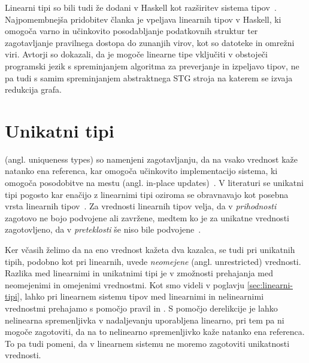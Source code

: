 Linearni tipi so bili tudi že dodani v Haskell kot razširitev sistema tipov~\cite{bernardy2018linear}. Najpomembnejša pridobitev članka je vpeljava linearnih tipov v Haskell, ki omogoča varno in učinkovito posodabljanje podatkovnih struktur ter zagotavljanje pravilnega dostopa do zunanjih virov, kot so datoteke in omrežni viri. Avtorji so dokazali, da je mogoče linearne tipe vključiti v obstoječi programski jezik s spreminjanjem algoritma za preverjanje in izpeljavo tipov, ne pa tudi s samim spreminjanjem abstraktnega STG stroja na katerem se izvaja redukcija grafa.

\section{Unikatni tipi}
\label{sec:unikatni-tipi}


 (angl. uniqueness types) so namenjeni zagotavljanju, da na vsako vrednost kaže natanko ena referenca, kar omogoča učinkovito implementacijo sistema, ki omogoča posodobitve na mestu (angl. in-place updates)~\cite{marshall2022linearity}. V literaturi se unikatni tipi pogosto kar enačijo z linearnimi tipi oziroma se obravnavajo kot posebna vrsta linearnih tipov~\cite{pierce2004advanced, bernardy2018linear}. Za vrednosti linearnih tipov velja, da v \textit{prihodnosti} zagotovo ne bojo podvojene ali zavržene, medtem ko je za unikatne vrednosti zagotovljeno, da v \textit{preteklosti} še niso bile podvojene~\cite{marshall2022linearity, marshall2024functional}.

Ker včasih želimo da na eno vrednost kažeta dva kazalca, se tudi pri unikatnih tipih, podobno kot pri linearnih, uvede \emph{neomejene} (angl. unrestricted) vrednosti. Razlika med linearnimi in unikatnimi tipi je v zmožnosti prehajanja med neomejenimi in omejenimi vrednostmi. Kot smo videli v poglavju \ref{sec:linearni-tipi}, lahko pri linearnem sistemu tipov med linearnimi in nelinearnimi vrednostmi prehajamo s pomočjo pravil  in . S pomočjo derelikcije je lahko nelinearna spremenljivka v nadaljevanju uporabljena linearno, pri tem pa ni mogoče zagotoviti, da na to nelinearno spremenljivko kaže natanko ena referenca. To pa tudi pomeni, da v linearnem sistemu ne moremo zagotoviti unikatnosti vrednosti.

